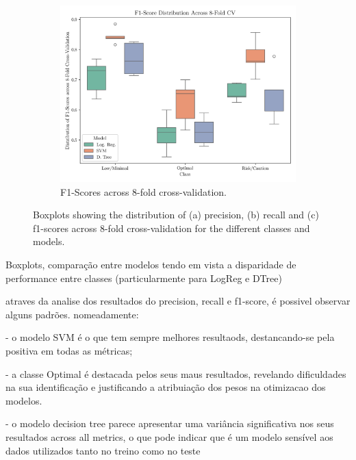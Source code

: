 \documentclass[conference]{IEEEtran}
\begin{document}
\begin{figure}[H]
    \vspace{0.5cm}

    \begin{subfigure}[1]{\linewidth}
        \centering
        \includegraphics[width=1\linewidth]{assets/box_f1score.png}
        \caption{F1-Scores across 8-fold cross-validation.}
        \label{box_f1score}
    \end{subfigure}
    
    \caption{Boxplots showing the distribution of (a) precision, (b) recall and (c) f1-scores across 8-fold cross-validation for the different classes and models.}
    \label{box_plots1}
\end{figure} %


Boxplots, comparação entre modelos tendo em vista a disparidade de performance entre classes (particularmente para LogReg e DTree)

atraves da analise dos resultados do precision, recall e f1-score, é possivel observar alguns padrões. nomeadamente:

- o modelo SVM é o que tem sempre melhores resultaods, destancando-se pela positiva em todas as métricas;

- a classe Optimal é destacada pelos seus maus resultados, revelando dificuldades na sua identificação e justificando a atribuiação dos pesos na otimizacao dos modelos.

- o modelo decision tree parece apresentar uma variância significativa nos seus resultados across all metrics, o que pode indicar que é um modelo sensível aos dados utilizados tanto no treino como no teste
\end{document}
